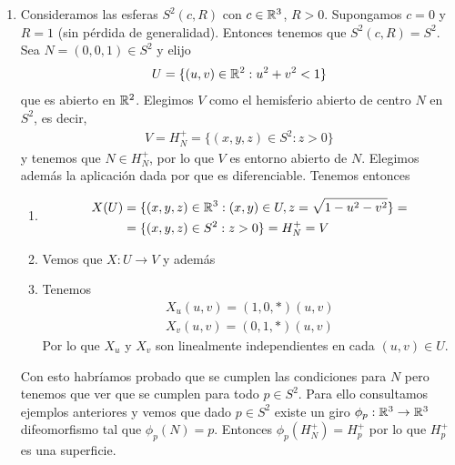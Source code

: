 \begin{ejemplo}
\begin{enumerate}
\begin{enumerate}
            \item Sea $q'\in U'=U$, entonces tenemos que 
            \begin{gather*}
                (dX')_q = d(\phi \circ X)_{q'}
            \end{gather*}
        \end{enumerate}

        \item Consideramos las esferas $S^2(c, R)$ con $c\in \mathbb{R}^3$, $R>0$. Supongamos $c=0$ y $R=1$ (sin pérdida de generalidad). Entonces tenemos que $S^2(c, R) = S^2$. Sea $N=(0,0,1)\in S^2$ y elijo 
        \begin{gather*}
            U=\{(u,v)\in \mathbb{R}^2 : u^2 + v^2 <1\}
        \end{gather*}
        que es abierto en $\mathbb{R}^2$. Elegimos $V$ como el hemisferio abierto de centro $N$ en $S^2$, es decir,
        \begin{gather*}
            V = H_N^+ = \{(x,y,z)\in S^2 : z>0\}
        \end{gather*}
        y tenemos que $N\in H_N^+$, por lo que $V$ es entorno abierto de $N$. Elegimos además la aplicación dada por 
        que es diferenciable. Tenemos entonces
        \begin{enumerate}
            \item \begin{align*}
                X(U)&=\{(x,y,z)\in \mathbb{R}^3 : (x,y)\in U, z=\sqrt{1-u^2-v^2}\} =\\
                &= \{(x,y,z)\in S^2 : z>0\} = H_N^+ = V
            \end{align*}

            \item Vemos que $X:U\to V$ y además 
            \item Tenemos 
            \begin{gather*}
                X_u(u,v) = (1,0,\ast)(u,v)\\
                X_v(u,v) = (0,1,\ast)(u,v)
            \end{gather*}
            Por lo que $X_u$ y $X_v$ son linealmente independientes en cada $(u,v)\in U$.
        \end{enumerate}
        Con esto habríamos probado que se cumplen las condiciones para $N$ pero tenemos que ver que se cumplen para todo $p\in S^2$. Para ello consultamos ejemplos anteriores y vemos que dado $p\in S^2$ existe un giro $\phi_p : \mathbb{R}^3 \to \mathbb{R}^3$ difeomorfismo tal que $\phi_p(N)=p$. Entonces $\phi_p(H_N^+) = H_p^+$ por lo que $H_p^+$ es una superficie.\\


\end{enumerate}
\end{ejemplo}
